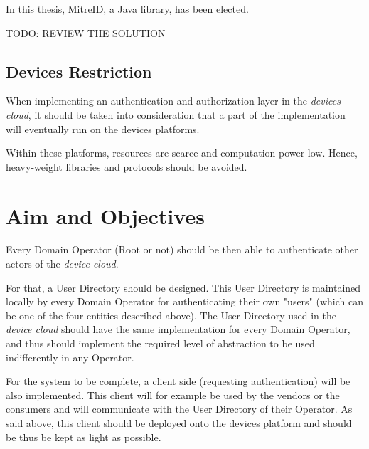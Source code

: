 In this thesis, MitreID, a Java library, has been elected.

{ \huge TODO: REVIEW THE SOLUTION }





\subsection{Devices Restriction}
When implementing an authentication and authorization layer in the \emph{devices cloud}, it should be taken into consideration that a part of the implementation will eventually run on the devices platforms. 

Within these platforms, resources are scarce and computation power low. Hence, heavy-weight libraries and protocols should be avoided.

\section{Aim and Objectives}
Every Domain Operator (Root or not) should be then able to authenticate other actors of the \emph{device cloud}.

For that, a User Directory should be designed. This User Directory is maintained locally by every Domain Operator for authenticating their own "users" (which can be one of the four entities described above). The User Directory used in the \emph{device cloud} should have the same implementation for every Domain Operator, and thus should implement the required level of abstraction to be used indifferently in any Operator.

For the system to be complete, a client side (requesting authentication) will be also implemented. This client will for example be used by the vendors or the consumers and will communicate with the User Directory of their Operator. As said above, this client should be deployed onto the devices platform and should be thus be kept as light as possible.

